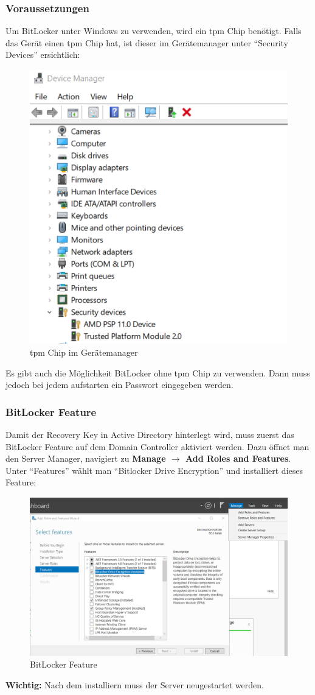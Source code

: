 \subsubsection{Voraussetzungen}
Um BitLocker unter Windows zu verwenden, wird ein \acrfull{tpm} Chip benötigt.
Falls das Gerät einen \acrshort{tpm} Chip hat, ist dieser im Gerätemanager unter ``Security Devices'' ersichtlich:
\begin{figure}[H]
    \centering
    \includegraphics[width=0.6\linewidth]{../img/Encryption/tpm-chip-device-manager.png}
    \caption{\acrshort{tpm} Chip im Gerätemanager}
\end{figure}
Es gibt auch die Möglichkeit BitLocker ohne \acrshort{tpm} Chip zu verwenden. Dann muss jedoch bei jedem aufstarten ein Passwort eingegeben werden.

\subsubsection{BitLocker Feature}
Damit der Recovery Key in Active Directory hinterlegt wird, muss zuerst das BitLocker Feature auf dem Domain Controller aktiviert werden.
Dazu öffnet man den Server Manager, navigiert zu \textbf{Manage $\rightarrow$ Add Roles and Features}.
Unter ``Features'' wählt man ``Bitlocker Drive Encryption'' und installiert dieses Feature:
\begin{figure}[H]
    \centering
    \includegraphics[width=0.7\linewidth]{../img/Encryption/bitlocker-feature.png}
    \caption{BitLocker Feature}
\end{figure}
\textbf{Wichtig:} Nach dem installiern muss der Server neugestartet werden.

